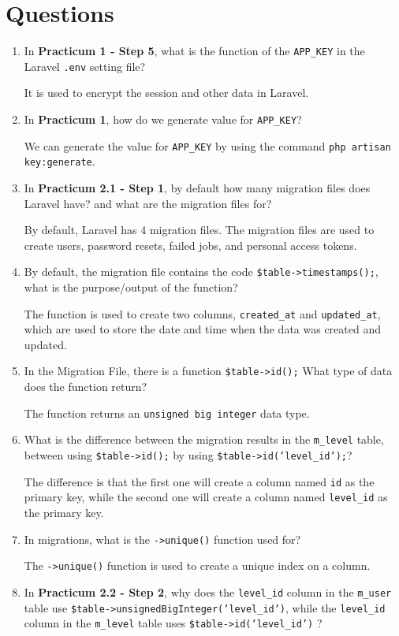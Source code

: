 \documentclass[12pt,titlepage]{article}
\begin{document}
\section{Questions}
\begin{enumerate}
    \item {
        In \textbf{Practicum 1 - Step 5}, what is the function of the \texttt{APP\_KEY} in the Laravel \texttt{.env} setting file?

        It is used to encrypt the session and other data in Laravel.
    }
    \item {
        In \textbf{Practicum 1}, how do we generate value for \texttt{APP\_KEY}?

        We can generate the value for \texttt{APP\_KEY} by using the command \texttt{php artisan key:generate}.
    }
    \item {
        In \textbf{Practicum 2.1 - Step 1}, by default how many migration files does Laravel have? and what are the migration files for?

        By default, Laravel has 4 migration files. The migration files are used to create users, password resets, failed jobs, and personal access tokens.
    }
    \item {
        By default, the migration file contains the code \texttt{\$table->timestamps();}, what is the purpose/output of the function?

        The function is used to create two columns, \texttt{created\_at} and \texttt{updated\_at}, which are used to store the date and time when the data was created and updated.
    }
    \item {
        In the Migration File, there is a function \texttt{\$table->id();} What type of data does the function return?

        The function returns an \texttt{unsigned big integer} data type.
    }
    \item {
        What is the difference between the migration results in the \texttt{m\_level} table, between using \texttt{\$table->id();} by using \texttt{\$table->id('level\_id');}?

        The difference is that the first one will create a column named \texttt{id} as the primary key, while the second one will create a column named \texttt{level\_id} as the primary key.
    }
    \item {
        In migrations, what is the \texttt{->unique()} function used for?

        The \texttt{->unique()} function is used to create a unique index on a column.
    }
    \item {
        In \textbf{Practicum 2.2 - Step 2}, why does the \texttt{level\_id} column in the \texttt{m\_user} table use \texttt{\$table->unsignedBigInteger('level\_id')}, while the \texttt{level\_id} column in the \texttt{m\_level} table uses \texttt{\$table->id('level\_id')} ?

}
\end{enumerate}
\end{document}
